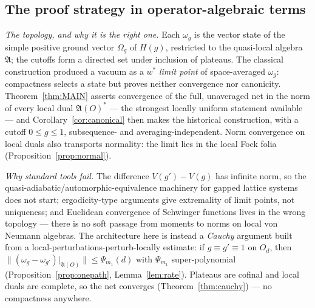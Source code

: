 \documentclass[11pt,a4paper]{article}
\theoremstyle{plain}
\theoremstyle{definition}
\theoremstyle{plain}
\theoremstyle{definition}
\newcommand{\A}{\mathfrak{A}}
\newcommand{\Om}{\Omega}
\begin{document}
\subsection{The proof strategy in operator-algebraic terms}\label{subsec:strategy}


\emph{The topology, and why it is the right one.} Each $\omega_g$ is the vector state of
the simple positive ground vector $\Om_g$ of $H(g)$, restricted to the quasi-local
algebra $\A$; the cutoffs form a directed set under inclusion of plateaus. The classical
construction \cite{GJ3} produced a vacuum as a $w^*$ \emph{limit point} of space-averaged
$\omega_g$: compactness selects a state but proves neither convergence nor canonicity.
Theorem~\ref{thm:MAIN} asserts convergence of the full, unaveraged net in the norm of
every local dual $\A(O)^*$ --- the strongest locally uniform statement available --- and
Corollary~\ref{cor:canonical} then makes the historical construction, with a cutoff $0\le
g\le1$, subsequence- and averaging-independent. Norm convergence on local duals also transports normality: the
limit lies in the local Fock folia (Proposition~\ref{prop:normal}).

\emph{Why standard tools fail.} The difference $V(g')-V(g)$ has infinite norm, so the
quasi-adiabatic/automorphic-equivalence machinery for gapped lattice systems
\cite{Hastings,BMNS} does not start; ergodicity-type arguments give extremality of limit
points, not uniqueness; and Euclidean convergence of Schwinger functions lives in the
wrong topology --- there is no soft passage from moments to norms on local von Neumann
algebras. The architecture here is instead a \emph{Cauchy} argument built from a
local-perturbations-perturb-locally estimate: if $g\equiv g'\equiv1$ on $O_d$, then
$\|(\omega_g-\omega_{g'})|_{\A(O)}\|\le\Psi_{m_1}(d)$ with $\Psi_{m_1}$ super-polynomial
(Proposition~\ref{prop:onepath}, Lemma~\ref{lem:rate}). Plateaus are cofinal and local
duals are complete, so the net converges (Theorem~\ref{thm:cauchy}) --- no compactness
anywhere.
\end{document}

